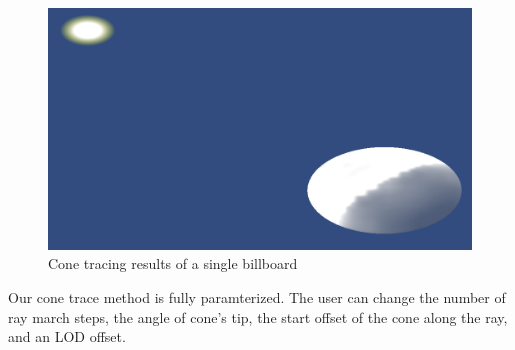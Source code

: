 \begin{figure}[h]
\centering
\includegraphics[width=\textwidth]{../res/conetrace.png}
\caption{Cone tracing results of a single billboard}
\end{figure}

Our cone trace method is fully paramterized. The user can change the number of ray march steps, the angle of cone's tip, the start offset of the cone along the ray, and an LOD offset. 

